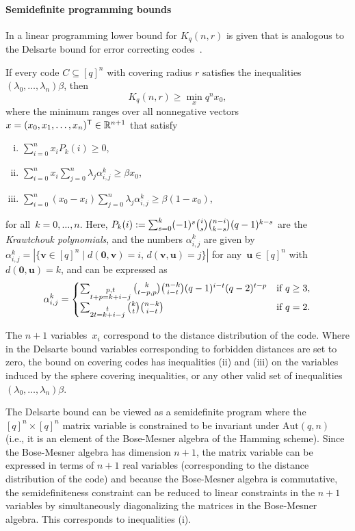 \documentclass[10pt,a4paper]{article}
\newcommand{\R}{\mathbb{R}}
\theoremstyle{definition}
\newcommand{\uu}{\mathbf{u}}
\newcommand{\Aut}{\mathrm{Aut}}
\begin{document}
\paragraph{Semidefinite programming bounds}
In \cite[Section 5.3.1]{DionThesis} a linear programming lower bound for $K_q(n,r)$ is given that is analogous to the Delsarte bound for error correcting codes~\cite{Del73}. 

If every code $C\subseteq [q]^n$ with covering radius $r$ satisfies the inequalities $(\lambda_0,\ldots,\lambda_n)\beta$, then 
\[
K_q(n,r) \geq \min_x q^n x_0,
\]
where the minimum ranges over all nonnegative vectors $x=(x_0,x_1,\ldots,x_n)^{\sf T} \in \R^{n+1}$ that satisfy
\begin{enumerate}[(i)]
\item $\sum_{i=0}^n x_i P_k(i) \geq 0$,
\item $\sum_{i=0}^n x_i \sum_{j=0}^n \lambda_j \alpha_{i,j}^k \geq \beta x_0$,
\item $\sum_{i=0}^n (x_0-x_i) \sum_{j=0}^n \lambda_j \alpha_{i,j}^k \geq \beta (1-x_0)$,
\end{enumerate}
for all~$k=0,\ldots,n$. Here, $P_k(i):= \sum_{s=0}^k (-1)^s \tbinom{i}{s}\tbinom{n-i}{k-s}(q-1)^{k-s}$ are the \emph{Krawtchouk polynomials}, and the numbers $\alpha_{i, j}^k$ are given by $\alpha_{i, j}^k= |\{ \mathbf{v}\in[q]^n \mid d(\mathbf{0}, \mathbf{v}) = i,\, d(\mathbf{v}, \mathbf{u}) = j \}|$   for any~$\uu \in[q]^n$ with $d(\mathbf{0}, \mathbf{u}) = k$, and can be expressed as
\[
\alpha_{i, j}^k = \begin{cases}  
\sum_{\substack{p, t \\ t + p = k + i - j}} \tbinom{k}{t - p, p} \tbinom{n - k }{i - t} (q - 1)^{i - t} (q - 2)^{t - p} & \text{if } q \geq 3, \\
\sum_{\substack{t \\ 2t = k + i - j}} \tbinom{k}{t} \tbinom{n - k}{i - t} & \text{if } q = 2.  
\end{cases}  
\] 


The $n+1$ variables~$x_i$ correspond to the distance distribution of the code. Where in the Delsarte bound variables corresponding to forbidden distances are set to zero, the bound on covering codes has inequalities (ii) and (iii) on the variables induced by the sphere covering inequalities, or any other valid set of inequalities $(\lambda_0,\ldots, \lambda_n)\beta$. 

The Delsarte bound can be viewed as a semidefinite program 
where the $[q]^n\times [q]^n$ matrix variable is constrained to be invariant under $\Aut(q,n)$ (i.e., it is an element of the Bose-Mesner algebra of the Hamming scheme). Since the Bose-Mesner algebra has dimension $n+1$, the matrix variable can be expressed in terms of $n+1$ real variables (corresponding to the distance distribution of the code) and because the Bose-Mesner algebra is commutative, the semidefiniteness constraint can be reduced to linear constraints in the $n+1$ variables by simultaneously diagonalizing the matrices in the Bose-Mesner algebra. This corresponds to inequalities (i).
\end{document}
